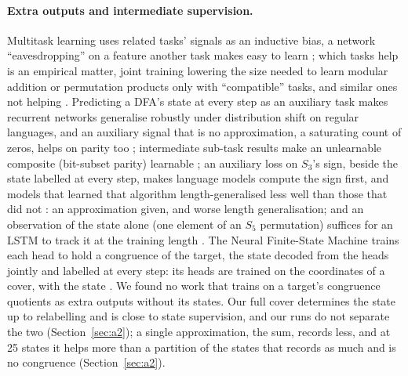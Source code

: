 \documentclass[11pt]{article}
\begin{document}
\paragraph{Extra outputs and intermediate supervision.} Multitask learning uses related tasks'
signals as an inductive bias, a network ``eavesdropping'' on a feature another task makes easy to
learn \citep{caruana-1997-multitask-learning}; which tasks help is an empirical matter, joint
training lowering the size needed to learn modular addition or permutation products only with
``compatible'' tasks, and similar ones not helping
\citep{both-2025-joint-task-training-small-models}. Predicting a DFA's state at every step as an
auxiliary task makes recurrent networks generalise robustly under distribution shift on regular
languages, and an auxiliary signal that is no approximation, a saturating count of zeros, helps on
parity too \citep{dan-2022-robust-generalization-regular-languages}; intermediate sub-task results make an
unlearnable composite (bit-subset parity) learnable
\citep{wies-2023-sub-task-decomposition-sequence-tasks}; an auxiliary loss on $S_3$'s sign, beside
the state labelled at every step, makes language models compute the sign first, and models that learned that algorithm
length-generalised less well than those that did not
\citep{li-2025-how-language-models-track-state}: an approximation given, and worse length
generalisation; and an observation of the state alone (one element
of an $S_5$ permutation) suffices for an LSTM to track it at the training length
\citep{liu-2022-transformers-shortcuts-automata}. The Neural Finite-State Machine trains each head to hold a
congruence of the target, the state decoded from the heads jointly and labelled at every step: its
heads are trained on the coordinates of a cover, with the state
\citep{brandoit-2026-length-independent-state-tracking}. We found no work that trains on a target's
congruence quotients as extra outputs without its states. Our full cover determines the state up to
relabelling and is close to state supervision, and our runs do not separate the two
(Section~\ref{sec:a2}); a single approximation, the sum, records less, and at 25 states it helps
more than a partition of the states that records as much and is no congruence (Section~\ref{sec:a2}).
\end{document}
